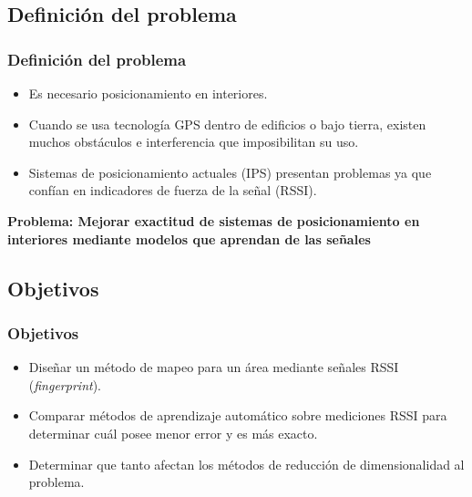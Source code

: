 \documentclass[handout]{beamer}
\begin{document}
\subsection{Definición del problema}

\begin{frame}
\frametitle{Definición del problema}

\begin{itemize}

\item Es necesario posicionamiento en interiores.

\pause
\item Cuando se usa tecnología GPS dentro de edificios o bajo tierra, existen muchos obstáculos e interferencia que imposibilitan su uso.

\pause
\item Sistemas de posicionamiento actuales (IPS) presentan problemas ya que confían en indicadores de fuerza de la señal (RSSI).

\end{itemize}

\pause
\vspace*{.5cm}
\textbf{Problema: Mejorar exactitud de sistemas de posicionamiento en interiores mediante modelos que aprendan de las señales}

\end{frame}


\subsection{Objetivos} %

\begin{frame}
\frametitle{Objetivos}

\begin{itemize}

\item Diseñar un método de mapeo para un área mediante señales RSSI (\textit{fingerprint}).
\pause
\item Comparar métodos de aprendizaje automático sobre mediciones RSSI para determinar cuál posee menor error y es más exacto.
\pause
\item Determinar que tanto afectan los métodos de reducción de dimensionalidad al problema.

\end{itemize}

\end{frame}
\end{document}
